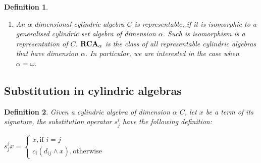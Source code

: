 \documentclass[a4paper]{article}
\theoremstyle{defin}
\newtheorem{defin}{Definition}
\theoremstyle{theorem}
\theoremstyle{prop}
\theoremstyle{lemma}
\theoremstyle{fact}
\theoremstyle{ex}
\theoremstyle{col}
\begin{document}
\begin{defin}
\begin{enumerate}
\begin{itemize}
      \item If $i \neq j$, then $c_i (d_{ij} \land a) \land c_i (d_{ij} \land - a) = 0$
    \end{itemize}
    ${\bf CA}_{\alpha}$ is the class of all cylindric algebras of dimension $\alpha$
    \item An $\alpha$-dimensional cylindric algebra $C$ is representable, if it is isomorphic to a generalised cylindric set algebra
    of dimension $\alpha$. Such is isomorphism is a representation of $C$.
    ${\bf RCA}_{\alpha}$ is the class of all representable cylindric algebras that have dimension $\alpha$. In particular, we are interested in the case when $\alpha = \omega$.
  \end{enumerate}
\end{defin}

\subsection{Substitution in cylindric algebras}

\begin{defin}
  Given a cylindric algebra of dimension $\alpha$ $C$, let $x$ be a term of its signature, the substitution operator $s^{i}_{j}$ have the following definition:
  \begin{center}
  $s^{i}_{j} x = \begin{cases} x, \text{if } i = j \\ c_i (d_{ij} \land x), \text{otherwise} \end{cases}$
  \end{center}
\end{defin}
\end{document}
